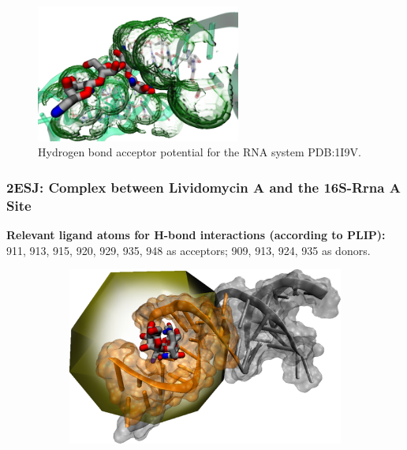       \begin{figure}[H]
        \centering
        \includegraphics[width=0.6\textwidth]{figures/results/benchmark_rna/1i9v.png}
        \caption{\label{fig:benchmark/1i9v} Hydrogen bond acceptor potential for the RNA system PDB:1I9V.}
      \end{figure}
    \pagebreak

    \subsubsection{2ESJ: Complex between Lividomycin A and the 16S-Rrna A Site}
      \textbf{Relevant ligand atoms for H-bond interactions (according to PLIP):} 911, 913, 915, 920, 929, 935, 948 as acceptors; 909, 913, 924, 935 as donors.

      \begin{figure}[H] \centering
        \begin{subfigure}[c]{0.3\textwidth} \centering
          \includegraphics[width=1\textwidth]{figures/results/ps_rna/2esj.png}
        \end{subfigure}
        \begin{subfigure}[c]{0.3\textwidth} \centering
        \end{subfigure}
      \end{figure}

